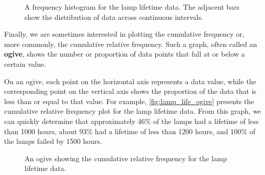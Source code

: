 \begin{figure}[htbp]
\centering
{}
\caption{A frequency histogram for the lamp lifetime data. The adjacent bars show the distribution of data across continuous intervals.}
\label{fig:lamp_life_histogram}
\end{figure}

Finally, we are sometimes interested in plotting the cumulative frequency or, more commonly, the cumulative relative frequency. Such a graph, often called an \textbf{ogive}, shows the number or proportion of data points that fall at or below a certain value.

On an ogive, each point on the horizontal axis represents a data value, while the corresponding point on the vertical axis shows the proportion of the data that is less than or equal to that value. For example, \autoref{fig:lamp_life_ogive} presents the cumulative relative frequency plot for the lamp lifetime data. From this graph, we can quickly determine that approximately 46\% of the lamps had a lifetime of less than 1000 hours, about 93\% had a lifetime of less than 1200 hours, and 100\% of the lamps failed by 1500 hours.

\begin{figure}[htbp]
\centering
{}
\caption{An ogive showing the cumulative relative frequency for the lamp lifetime data.}
\label{fig:lamp_life_ogive}
\end{figure}


